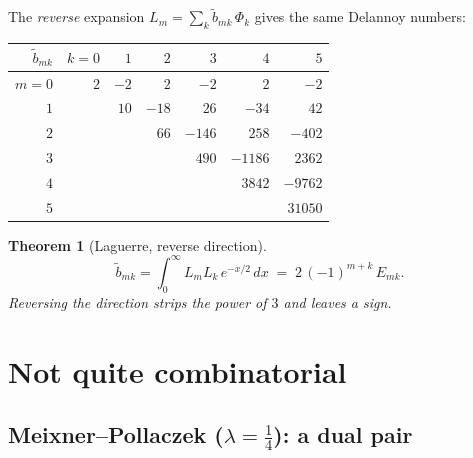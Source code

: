 \documentclass[11pt,a4paper]{article}
\newtheorem{theorem}{Theorem}[section]
\theoremstyle{definition}
\begin{document}
The \emph{reverse} expansion $L_m = \sum_k \widetilde b_{mk}\, \Phi_k$
gives the same Delannoy numbers:

\begin{tcolorbox}[colback=black!5, colframe=black!5, boxrule=0pt, sharp corners]
\begin{center}
\begin{tabular}{r|rrrrrr}
$\widetilde b_{mk}$ & $k=0$ & $1$ & $2$ & $3$ & $4$ & $5$ \\
\hline
$m=0$ & $2$ & $-2$ & $2$ & $-2$ & $2$ & $-2$ \\
$1$ &  & $10$ & $-18$ & $26$ & $-34$ & $42$ \\
$2$ &  &  & $66$ & $-146$ & $258$ & $-402$ \\
$3$ &  &  &  & $490$ & $-1186$ & $2362$ \\
$4$ &  &  &  &  & $3842$ & $-9762$ \\
$5$ &  &  &  &  &  & $31050$ \\
\end{tabular}
\end{center}
\end{tcolorbox}

\begin{tcolorbox}[colback=black!5, colframe=black!5, boxrule=0pt, sharp corners]
\begin{theorem}[Laguerre, reverse direction]\label{thm:laguerre-rev}
\[
  \widetilde b_{mk} = \int_0^\infty L_m L_k\, e^{-x/2}\, dx
  \;=\; 2\,(-1)^{m+k}\, E_{mk} .
\]
Reversing the direction strips the power of $3$ and leaves a sign.
\end{theorem}
\end{tcolorbox}


\section{Not quite combinatorial}

\subsection{Meixner--Pollaczek ($\lambda = \tfrac14$): a dual pair}
\end{document}
